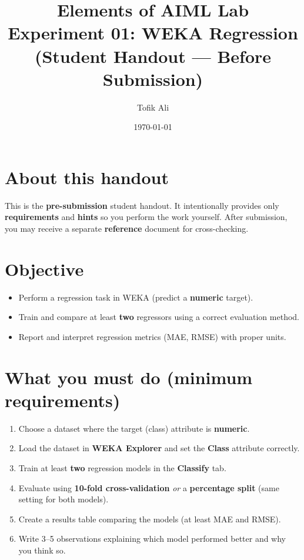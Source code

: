 \documentclass[11pt]{article}
\title{Elements of AIML Lab\\Experiment 01: WEKA Regression (Student Handout — Before Submission)}
\author{Tofik Ali}
\date{\today}
\begin{document}
\maketitle
\tableofcontents

\section{About this handout}
This is the \textbf{pre-submission} student handout.
It intentionally provides only \textbf{requirements} and \textbf{hints} so you perform the work yourself.
After submission, you may receive a separate \textbf{reference} document for cross-checking.

\section{Objective}
\begin{itemize}[leftmargin=*]
  \item Perform a regression task in WEKA (predict a \textbf{numeric} target).
  \item Train and compare at least \textbf{two} regressors using a correct evaluation method.
  \item Report and interpret regression metrics (MAE, RMSE) with proper units.
\end{itemize}

\section{What you must do (minimum requirements)}
\begin{enumerate}[leftmargin=*]
  \item Choose a dataset where the target (class) attribute is \textbf{numeric}.
  \item Load the dataset in \textbf{WEKA Explorer} and set the \textbf{Class} attribute correctly.
  \item Train at least \textbf{two} regression models in the \textbf{Classify} tab.
  \item Evaluate using \textbf{10-fold cross-validation} \emph{or} a \textbf{percentage split} (same setting for both models).
  \item Create a results table comparing the models (at least MAE and RMSE).
  \item Write 3--5 observations explaining which model performed better and why you think so.
\end{enumerate}
\end{document}
